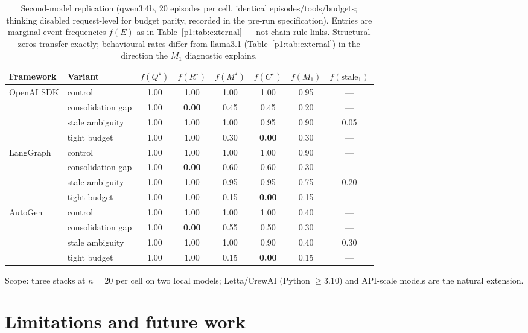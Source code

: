 \documentclass{article}
\begin{document}
\begin{table}[h]
\caption{Second-model replication (qwen3:4b, 20 episodes per cell,
identical episodes/tools/budgets; thinking disabled request-level for
budget parity, recorded in the pre-run specification). Entries are marginal
event frequencies $f(E)$ as in Table~\ref{p1:tab:external} --- not
chain-rule links. Structural zeros transfer exactly; behavioural
rates differ from llama3.1 (Table~\ref{p1:tab:external}) in the
direction the $M_1$ diagnostic explains.}
\label{p1:tab:external-qwen}
\centering
\small
\begin{tabular}{llcccccc}
\toprule
Framework & Variant & $f(Q^\star)$ & $f(R^\star)$ & $f(M^\star)$ & $f(C^\star)$ & $f(M_1)$ & $f(\text{stale}_1)$ \\
\midrule
OpenAI SDK & control     & 1.00 & 1.00 & 1.00 & 1.00 & 0.95 & --- \\
           & consolidation gap & 1.00 & \textbf{0.00} & 0.45 & 0.45 & 0.20 & --- \\
           & stale ambiguity   & 1.00 & 1.00 & 1.00 & 0.95 & 0.90 & 0.05 \\
           & tight budget      & 1.00 & 1.00 & 0.30 & \textbf{0.00} & 0.30 & --- \\
\midrule
LangGraph  & control     & 1.00 & 1.00 & 1.00 & 1.00 & 0.90 & --- \\
           & consolidation gap & 1.00 & \textbf{0.00} & 0.60 & 0.60 & 0.30 & --- \\
           & stale ambiguity   & 1.00 & 1.00 & 0.95 & 0.95 & 0.75 & 0.20 \\
           & tight budget      & 1.00 & 1.00 & 0.15 & \textbf{0.00} & 0.15 & --- \\
\midrule
AutoGen    & control     & 1.00 & 1.00 & 1.00 & 1.00 & 0.40 & --- \\
           & consolidation gap & 1.00 & \textbf{0.00} & 0.55 & 0.50 & 0.30 & --- \\
           & stale ambiguity   & 1.00 & 1.00 & 1.00 & 0.90 & 0.40 & 0.30 \\
           & tight budget      & 1.00 & 1.00 & 0.15 & \textbf{0.00} & 0.15 & --- \\
\bottomrule
\end{tabular}
\end{table}

Scope: three stacks at $n{=}20$ per cell on two local models;
Letta/CrewAI (Python $\ge$3.10) and API-scale models are the natural
extension.

\section{Limitations and future work}
\label{p1:sec:limitations}
\end{document}
